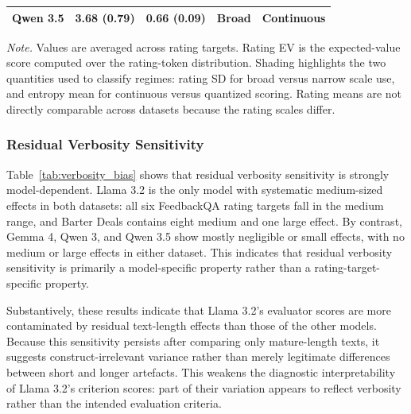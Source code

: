\begin{table}[!t]
\begin{tabular}{lcccc}
    Qwen 3.5  
        & \cellcolor{scaleBroad}3.68 (\textbf{0.79}) 
        & \cellcolor{entropyContinuous}\textbf{0.66} (0.09) 
        & \cellcolor{scaleBroad}Broad 
        & \cellcolor{entropyContinuous}Continuous \\
    \bottomrule
    \end{tabular}

    \begin{flushleft}
    \footnotesize
    \textit{Note.} Values are averaged across rating targets. Rating EV is the expected-value score computed over the rating-token distribution. Shading highlights the two quantities used to classify regimes: rating SD for broad versus narrow scale use, and entropy mean for continuous versus quantized scoring. Rating means are not directly comparable across datasets because the rating scales differ.
    \end{flushleft}
\end{table}


\subsubsection{Residual Verbosity Sensitivity}

Table~\ref{tab:verbosity_bias} shows that residual verbosity sensitivity is strongly model-dependent. Llama 3.2 is the only model with systematic medium-sized effects in both datasets: all six FeedbackQA rating targets fall in the medium range, and Barter Deals contains eight medium and one large effect. By contrast, Gemma 4, Qwen 3, and Qwen 3.5 show mostly negligible or small effects, with no medium or large effects in either dataset. This indicates that residual verbosity sensitivity is primarily a model-specific property rather than a rating-target-specific property.

Substantively, these results indicate that Llama 3.2's evaluator scores are more contaminated by residual text-length effects than those of the other models. Because this sensitivity persists after comparing only mature-length texts, it suggests construct-irrelevant variance rather than merely legitimate differences between short and longer artefacts. This weakens the diagnostic interpretability of Llama 3.2's criterion scores: part of their variation appears to reflect verbosity rather than the intended evaluation criteria. 


